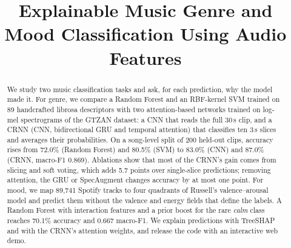 \documentclass[conference]{IEEEtran}
\begin{document}
\title{Explainable Music Genre and Mood Classification Using Audio Features}

\author{
\and
{}
\and
{}
\and
{}
}

\maketitle

\begin{abstract}
We study two music classification tasks and ask, for each prediction, why the model made it. For genre, we compare a Random Forest and an RBF-kernel SVM trained on 89 handcrafted librosa descriptors with two attention-based networks trained on log-mel spectrograms of the GTZAN dataset: a CNN that reads the full 30\,s clip, and a CRNN (CNN, bidirectional GRU and temporal attention) that classifies ten 3\,s slices and averages their probabilities. On a song-level split of 200 held-out clips, accuracy rises from 72.0\% (Random Forest) and 80.5\% (SVM) to 83.0\% (CNN) and 87.0\% (CRNN, macro-F1 0.869). Ablations show that most of the CRNN's gain comes from slicing and soft voting, which adds 5.7 points over single-slice predictions; removing attention, the GRU or SpecAugment changes accuracy by at most one point. For mood, we map 89{,}741 Spotify tracks to four quadrants of Russell's valence--arousal model and predict them without the valence and energy fields that define the labels. A Random Forest with interaction features and a prior boost for the rare \emph{calm} class reaches 70.1\% accuracy and 0.667 macro-F1. We explain predictions with TreeSHAP and with the CRNN's attention weights, and release the code with an interactive web demo.
\end{abstract}
\end{document}
